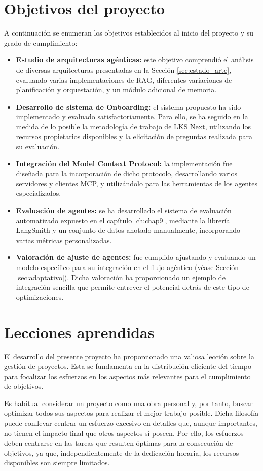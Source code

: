 \section{Objetivos del proyecto}
A continuación se enumeran los objetivos establecidos al inicio del proyecto y su grado de cumplimiento:
\begin{itemize}
\item\textbf{Estudio de arquitecturas agénticas: }este objetivo comprendió el análisis de diversas arquitecturas presentadas en la Sección \ref{sec:estado_arte}, evaluando varias implementaciones de RAG, diferentes variaciones de planificación y orquestación, y un módulo adicional de memoria.
\item\textbf{Desarrollo de sistema de Onboarding: }el sistema propuesto ha sido implementado y evaluado satisfactoriamente. Para ello, se ha seguido en la medida de lo posible la metodología de trabajo de LKS Next, utilizando los recursos propietarios disponibles y la elicitación de preguntas realizada para su evaluación.
\item\textbf{Integración del Model Context Protocol: }la implementación fue diseñada para la incorporación de dicho protocolo, desarrollando varios servidores y clientes MCP, y utilizándolo para las herramientas de los agentes especializados.
\item\textbf{Evaluación de agentes: }se ha desarrollado el sistema de evaluación automatizado expuesto en el capítulo \ref{ch:chap9}, mediante la librería LangSmith y un conjunto de datos anotado manualmente, incorporando varias métricas personalizadas.
\item\textbf{Valoración de ajuste de agentes: }fue cumplido ajustando y evaluando un modelo específico para su integración en el flujo agéntico (véase Sección \ref{sec:adaptativo}). Dicha valoración ha proporcionado un ejemplo de integración sencilla que permite entrever el potencial detrás de este tipo de optimizaciones.
\end{itemize}

\section{Lecciones aprendidas}
El desarrollo del presente proyecto ha proporcionado una valiosa lección sobre la gestión de proyectos. Esta se fundamenta en la distribución eficiente del tiempo para focalizar los esfuerzos en los aspectos más relevantes para el cumplimiento de objetivos.

Es habitual considerar un proyecto como una obra personal y, por tanto, buscar optimizar todos sus aspectos para realizar el mejor trabajo posible. Dicha filosofía puede conllevar centrar un esfuerzo excesivo en detalles que, aunque importantes, no tienen el impacto final que otros aspectos sí poseen. Por ello, los esfuerzos deben centrarse en las tareas que resulten óptimas para la consecución de objetivos, ya que, independientemente de la dedicación horaria, los recursos disponibles son siempre limitados.

